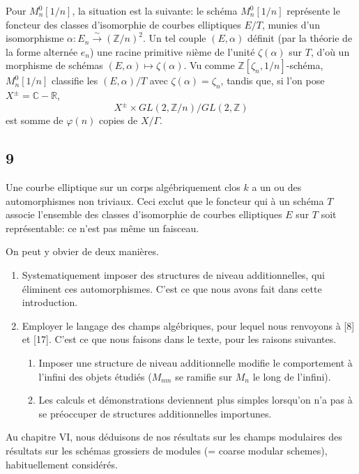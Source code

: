 \documentclass{amsart}
\theoremstyle{plain}
\theoremstyle{remark}
\newcommand{\bbC}{\mathbb{C}}
\newcommand{\bbR}{\mathbb{R}}
\newcommand{\bbZ}{\mathbb{Z}}
\begin{document}
Pour $M_n^0[1/n]$, la situation est la suivante: le sch\'ema $M_n^0[1/n]$ repr\'esente le foncteur des classes d'isomorphie de courbes elliptiques $E/T$, munies d'un isomorphisme $\alpha: E_n \xrightarrow{\sim} (\bbZ/n)^2$. Un tel couple $(E,\alpha)$ d\'efinit (par la th\'eorie de la forme altern\'ee $e_n$) une racine primitive $n$i\`eme de l'unit\'e $\zeta(\alpha)$ sur $T$, d'o\`u un morphisme de sch\'emas $(E,\alpha) \mapsto \zeta(\alpha)$. Vu comme $\bbZ[\zeta_n, 1/n]$-sch\'ema, $M_n^0[1/n]$ classifie les $(E,\alpha)/T$ avec $\zeta(\alpha) = \zeta_n$, tandis que, si l'on pose $X^\pm = \bbC - \bbR$,
\[
X^\pm \times GL(2,\bbZ/n) / GL(2,\bbZ)
\]
est somme de $\varphi(n)$ copies de $X/\Gamma$.

\subsection*{9}
Une courbe elliptique sur un corps alg\'ebriquement clos $k$ a un ou des automorphismes non triviaux. Ceci exclut que le foncteur qui \`a un sch\'ema $T$ associe l'ensemble des classes d'isomorphie de courbes elliptiques $E$ sur $T$ soit repr\'esentable: ce n'est pas m\^eme un faisceau.

On peut y obvier de deux mani\`eres.

\begin{enumerate}
\item[a)] Systematiquement imposer des structures de niveau additionnelles, qui \'eliminent ces automorphismes. C'est ce que nous avons fait dans cette introduction.
\item[b)] Employer le langage des champs alg\'ebriques, pour lequel nous renvoyons \`a [8] et [17]. C'est ce que nous faisons dans le texte, pour les raisons suivantes.
\begin{enumerate}
\item[1.] Imposer une structure de niveau additionnelle modifie le comportement \`a l'infini des objets \'etudi\'es ($M_{nm}$ se ramifie sur $M_n$ le long de l'infini).
\item[2.] Les calculs et d\'emonstrations deviennent plus simples lorsqu'on n'a pas \`a se pr\'eoccuper de structures additionnelles importunes.
\end{enumerate}
\end{enumerate}

Au chapitre VI, nous d\'eduisons de nos r\'esultats sur les champs modulaires des r\'esultats sur les sch\'emas grossiers de modules (= coarse modular schemes), habituellement consid\'er\'es.
\end{document}
